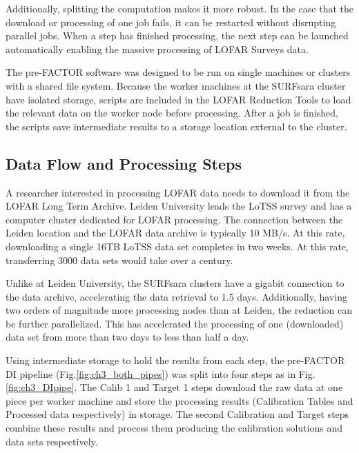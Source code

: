 Additionally, splitting the computation makes it more robust. In the case that the download or processing of one job fails, it can be restarted without disrupting parallel jobs. When a step has finished processing, the next step can be launched automatically enabling the massive processing of LOFAR Surveys data. 

The pre-FACTOR software was designed to be run on single machines or clusters with a shared file system. Because the worker machines at the SURFsara cluster have isolated storage, scripts are included in the LOFAR Reduction Tools to load the relevant data on the worker node before processing. After a job is finished, the scripts save intermediate results to a storage location external to the cluster. 

\subsection{Data Flow and Processing Steps}\label{sec:ch3_dataflow}

A researcher interested in processing LOFAR data needs to download it from the LOFAR Long Term Archive. Leiden University leads the LoTSS survey and has a computer cluster dedicated for LOFAR processing. The connection between the Leiden location and the LOFAR data archive is typically 10 MB/s. At this rate, downloading a single 16TB LoTSS data set completes in two weeks. At this rate, transferring 3000 data sets would take over a century. 

Unlike at Leiden University, the SURFsara clusters have a gigabit connection to the data archive, accelerating the data retrieval to 1.5 days. Additionally, having two orders of magnitude more processing nodes than at Leiden, the reduction can be further parallelized. This has accelerated the processing of one (downloaded) data set from more than two days to less than half a day.

Using intermediate storage to hold the results from each step, the pre-FACTOR DI pipeline (Fig.\ref{fig:ch3_both_pipes}) was split into four steps as in Fig. \ref{fig:ch3_DIpipe}. The Calib 1 and Target 1 steps download the raw data at one piece per worker machine and store the processing results (Calibration Tables and Processed data respectively) in storage. The second Calibration and Target steps combine these results and process them producing the calibration solutions and data sets respectively. 


